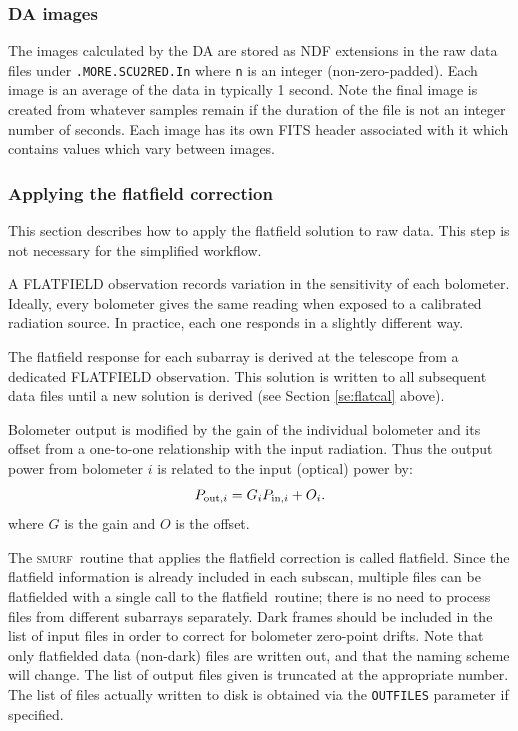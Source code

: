 \documentclass[twoside,11pt]{article}
\newcommand{\xref}[3]{#1}
\newcommand{\xlabel}[1]{}
\renewcommand{\_}{\texttt{\symbol{95}}}
\newcommand{\SMURF}{\textsc{smurf}}
\newcommand{\task}[1]{\textsf{#1}}
\newcommand{\flatfield}{\xref{\task{flatfield}}{sun258}{FLATFIELD}}
\newcommand{\aparam}[1]{\texttt{#1}}     %
\begin{document}
\subsubsection{DA images}

The images calculated by the DA are stored as NDF extensions in the
raw data files under \texttt{.MORE.SCU2RED.In} where \texttt{n} is an
integer (non-zero-padded). Each image is an average of the data in
typically 1 second. Note the final image is created from whatever
samples remain if the duration of the file is not an integer number of
seconds. Each image has its own FITS header associated with it which
contains values which vary between images.

\subsubsection{\xlabel{flatfield}Applying the flatfield correction\label{se:flatfield}}

This section describes how to apply the flatfield solution to raw
data. This step is not necessary for the simplified workflow.

A FLATFIELD observation records variation in the sensitivity of each
bolometer. Ideally, every bolometer gives the same reading when
exposed to a calibrated radiation source. In practice, each one
responds in a slightly different way.

The flatfield response for each subarray is derived at the telescope
from a dedicated FLATFIELD observation. This solution is written to
all subsequent data files until a new solution is derived (see Section
\ref{se:flatcal} above).

Bolometer output is modified by the gain of the individual bolometer
and its offset from a one-to-one relationship with the input
radiation. Thus the output power from bolometer $i$ is related to the
input (optical) power by:
\begin{equation}
P_{{\rm out},i} = G_i P_{{\rm in},i} + O_i.
\end{equation}
where $G$ is the gain and $O$ is the offset.

The \SMURF\ routine that applies the flatfield correction is called
\flatfield. Since the flatfield information is already included in
each subscan, multiple files can be flatfielded with a single call to
the \flatfield\ routine; there is no need to process files from
different subarrays separately. Dark frames should be included in the
list of input files in order to correct for bolometer zero-point
drifts. Note that only flatfielded data (non-dark) files are written
out, and that the naming scheme will change. The list of output files
given is truncated at the appropriate number. The list of files
actually written to disk is obtained via the \aparam{OUTFILES}
parameter if specified.
\end{document}

